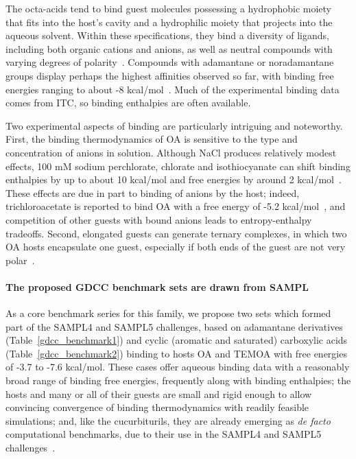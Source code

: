 \documentclass[aps,pre,twocolumn,nofootinbib,superscriptaddress,10pt, final,tightenlines]{revtex4-1}
\begin{document}
The octa-acids tend to bind guest molecules possessing a hydrophobic moiety that fits into the host's cavity and a hydrophilic moiety that projects into the aqueous solvent.  
Within these specifications, they bind a diversity of ligands, including both organic cations and anions, as well as neutral compounds with varying degrees of polarity~\cite{gibb_guests_2009, gibb_binding_2013}.  
Compounds with adamantane or noradamantane groups display perhaps the highest affinities observed so far, with binding free energies ranging to about -8 kcal/mol~\cite{sun_calorimetric_2008}.  
Much of the experimental binding data comes from ITC, so binding enthalpies are often available. 

Two experimental aspects of binding are particularly intriguing and noteworthy. 
First, the binding thermodynamics of OA is sensitive to the type and concentration of anions in solution. 
Although NaCl produces relatively modest effects, 100 mM sodium perchlorate, chlorate and isothiocyanate can shift binding enthalpies by up to about 10 kcal/mol and free energies by around 2 kcal/mol~\cite{gibb_anion_2011}. 
These effects are due in part to binding of anions by the host; indeed, trichloroacetate is reported to bind OA with a free energy of -5.2 kcal/mol~\cite{sokkalingam_binding_2016}, and competition of other guests with bound anions leads to entropy-enthalpy tradeoffs. 
Second, elongated guests can generate ternary complexes, in which two OA hosts encapsulate one guest, especially if both ends of the guest are not very polar~\cite{gibb_guests_2009}.  

\paragraph{The proposed GDCC benchmark sets are drawn from SAMPL}
As a core benchmark series for this family, we propose two sets which formed part of the SAMPL4 and SAMPL5 challenges, based on adamantane derivatives (Table~\ref{gdcc_benchmark1}) and cyclic (aromatic and saturated) carboxylic acids (Table~\ref{gdcc_benchmark2}) binding to hosts OA and TEMOA with free energies of -3.7 to -7.6 kcal/mol. These cases offer aqueous binding data with a reasonably broad range of binding free energies, frequently along with binding enthalpies; the hosts and many or all of their guests are small and rigid enough to allow convincing convergence of binding thermodynamics with readily feasible simulations; and, like the cucurbiturils, they are already emerging as \emph{de facto} computational benchmarks, due to their use in the SAMPL4 and SAMPL5 challenges~\cite{muddana_sampl4_2014, yin_overview_2016}. 
\end{document}

